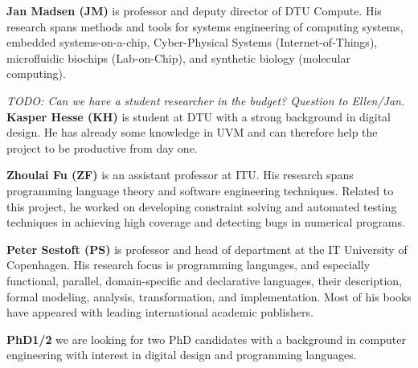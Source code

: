 \documentclass[fleqn,12pt]{article}
\newcommand{\todo}[1]{{\it TODO: #1}}
\begin{document}
{\bf Jan Madsen (JM)} is professor and deputy director of DTU Compute.
His research spans methods
and tools for systems engineering of computing systems, embedded systems-on-a-chip,
Cyber-Physical Systems (Internet-of-Things), microfluidic biochips (Lab-on-Chip), and
synthetic biology (molecular computing). 

\todo{Can we have a student researcher in the budget? Question to Ellen/Jan.}
{\bf Kasper Hesse (KH)} is student at DTU with a strong background in digital design.
He has already some knowledge in UVM and can therefore help the project to be productive
from day one.

{\bf Zhoulai Fu (ZF)} is an assistant professor at ITU. His research
spans programming language theory and software engineering
techniques. Related to this project, he worked on developing
constraint solving and automated testing techniques in achieving high
coverage and detecting bugs in numerical programs.

{\bf Peter Sestoft (PS)} is professor and head of department at the IT University of Copenhagen.
His research focus is programming languages, and especially functional, parallel, domain-specific
and declarative languages, their description, formal modeling, analysis, transformation, and implementation.
Most of his books have appeared with leading international academic publishers.

{\bf PhD1/2} we are looking for two PhD candidates with a background in computer engineering
with interest in digital design and programming languages.

%
\end{document}
